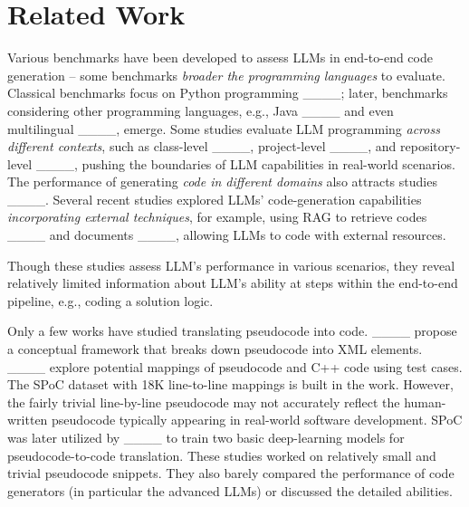 \section{Related Work}
\label{sec:related-work}


Various benchmarks have been developed to assess LLMs in end-to-end code generation -- %
some benchmarks {\textit{broader the programming languages}} to evaluate. Classical benchmarks focus on Python programming ____; later, benchmarks considering other programming languages, e.g., Java ____ and even multilingual ____, emerge. %
Some studies evaluate LLM programming {\textit{across different contexts}}, %
such as class-level ____, project-level ____, and repository-level ____, pushing the boundaries of LLM capabilities in real-world scenarios.
The performance of generating \textit{{code in different domains}} also attracts studies ____. %
Several recent studies explored LLMs' code-generation capabilities {\textit{incorporating external techniques}}, for example, using RAG to retrieve codes ____ and documents ____, allowing LLMs to code with external resources.

Though these studies assess LLM's performance in various scenarios, they reveal relatively limited information about LLM's ability at steps within the end-to-end pipeline, e.g., coding a solution logic.

Only a few works have studied translating pseudocode into code. ____ propose a conceptual framework that breaks down pseudocode into XML elements. ____ explore potential mappings of pseudocode and C++ code using test cases. The SPoC dataset with 18K line-to-line mappings is built in the work. However, the fairly trivial line-by-line pseudocode may not accurately reflect the human-written pseudocode typically appearing in real-world software development. SPoC was later utilized by ____ to train two basic deep-learning models for pseudocode-to-code translation.
These studies worked on relatively small and trivial pseudocode snippets. They also barely compared the performance of code generators (in particular the advanced LLMs) or discussed the detailed abilities. %